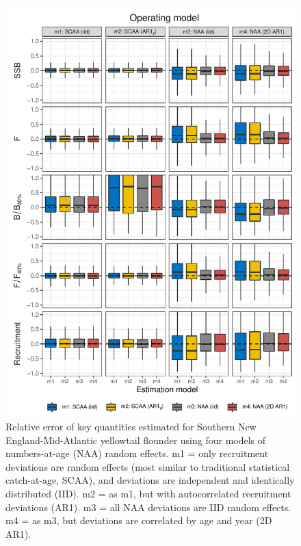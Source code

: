 \documentclass[]{article}
\begin{document}
\begin{figure}
\includegraphics[width=6in]{wham-sim-paper_files/figure-latex/snemayt-naa-1} \caption{Relative error of key quantities estimated for Southern New England-Mid-Atlantic yellowtail flounder using four models of numbers-at-age (NAA) random effects. m1 = only recruitment deviations are random effects (most similar to traditional statistical catch-at-age, SCAA), and deviations are independent and identically distributed (IID). m2 = as m1, but with autocorrelated recruitment deviations (AR1). m3 = all NAA deviations are IID random effects. m4 = as m3, but deviations are correlated by age and year (2D AR1).}\label{fig:snemayt-naa}
\end{figure}

\restoregeometry

\pagebreak
\end{document}
